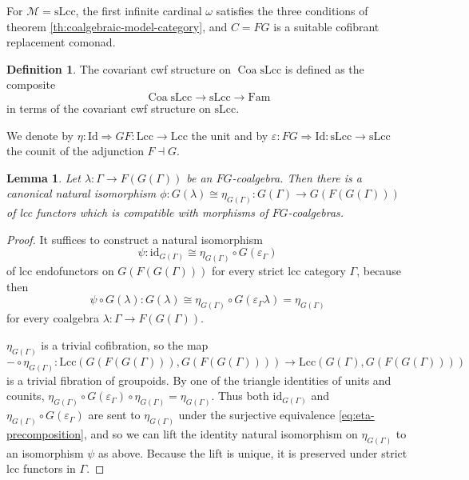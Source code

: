 \documentclass[a4paper]{article}
\newtheorem{lemma}[theorem]{Lemma}
\theoremstyle{remark}
\theoremstyle{definition}
\newtheorem{definition}[theorem]{Definition}
\begin{document}
For $\mathcal{M} = \mathrm{sLcc}$, the first infinite cardinal $\omega$ satisfies the three conditions of theorem \ref{th:coalgebraic-model-category}, and $C = FG$ is a suitable cofibrant replacement comonad.

\begin{definition}
  The covariant cwf structure on $\operatorname{Coa} \mathrm{sLcc}$ is defined as the composite
  \begin{equation}
    \operatorname{Coa} \mathrm{sLcc} \rightarrow \mathrm{sLcc} \rightarrow \mathrm{Fam}
  \end{equation}
  in terms of the covariant cwf structure on $\mathrm{sLcc}$.
\end{definition}

We denote by $\eta : \mathrm{Id} \Rightarrow G F : \mathrm{Lcc} \rightarrow \mathrm{Lcc}$ the unit and by $\varepsilon : F G \Rightarrow \mathrm{Id} : \mathrm{sLcc} \rightarrow \mathrm{sLcc}$ the counit of the adjunction $F \dashv G$.

\begin{lemma}
  \label{lem:coalgebra-vs-eta}
  Let $\lambda : \Gamma \rightarrow F(G(\Gamma))$ be an $FG$-coalgebra.
  Then there is a canonical natural isomorphism $\phi : G(\lambda) \cong \eta_{G(\Gamma)} : G(\Gamma) \rightarrow G(F(G(\Gamma)))$ of lcc functors which is compatible with morphisms of $FG$-coalgebras.
\end{lemma}
\begin{proof}
  It suffices to construct a natural isomorphism
  \begin{equation}
    \psi : \mathrm{id}_{G(\Gamma)} \cong \eta_{G(\Gamma)} \circ G(\varepsilon_\Gamma)
  \end{equation}
  of lcc endofunctors on $G(F(G(\Gamma)))$ for every strict lcc category $\Gamma$, because then
  \begin{equation}
    \psi \circ G(\lambda) : G(\lambda) \cong \eta_{G(\Gamma)} \circ G(\varepsilon_\Gamma \lambda) = \eta_{G(\Gamma)}
  \end{equation}
  for every coalgebra $\lambda : \Gamma \rightarrow F(G(\Gamma))$.

  $\eta_{G(\Gamma)}$ is a trivial cofibration, so the map
  \begin{equation}
    \label{eq:eta-precomposition}
    - \circ \eta_{G(\Gamma)} : \mathrm{Lcc}(G(F(G(\Gamma))), G(F(G(\Gamma)))) \rightarrow \mathrm{Lcc}(G(\Gamma), G(F(G(\Gamma)))) 
  \end{equation}
  is a trivial fibration of groupoids.
  By one of the triangle identities of units and counits, $\eta_{G(\Gamma)} \circ G(\varepsilon_\Gamma) \circ \eta_{G(\Gamma)} = \eta_{G(\Gamma)}$.
  Thus both $\mathrm{id}_{G(\Gamma)}$ and $\eta_{G(\Gamma)} \circ G(\varepsilon_\Gamma)$ are sent to $\eta_{G(\Gamma)}$ under the surjective equivalence \eqref{eq:eta-precomposition}, and so we can lift the identity natural isomorphism on $\eta_{G(\Gamma)}$ to an isomorphism $\psi$ as above.
  Because the lift is unique, it is preserved under strict lcc functors in $\Gamma$.
\end{proof}
\end{document}
